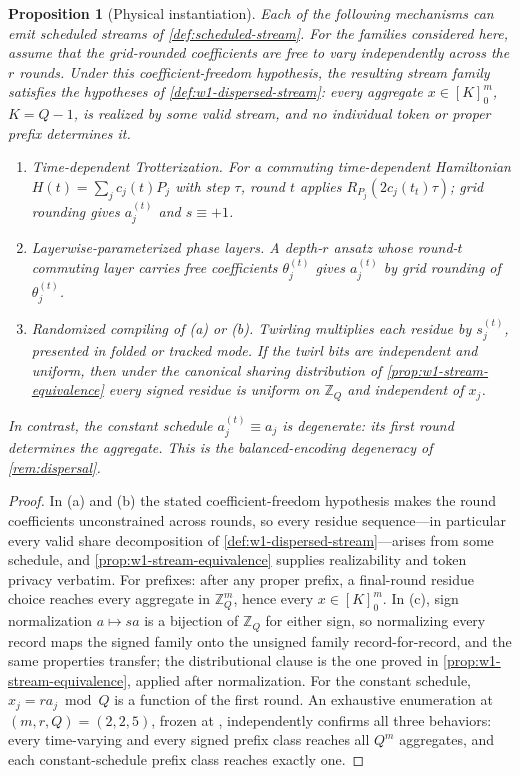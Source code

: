 \documentclass[a4paper,twocolumn,10pt,unpublished]{quantumarticle}
\newtheorem{proposition}{Proposition}
\begin{document}
\begin{proposition}[Physical instantiation]
\label{prop:physical-instantiation}
Each of the following mechanisms can emit scheduled streams of
\cref{def:scheduled-stream}.  For the families considered here, assume
that the grid-rounded coefficients are free to vary independently across
the $r$ rounds.  Under this coefficient-freedom hypothesis, the resulting
stream family satisfies the hypotheses of
\cref{def:w1-dispersed-stream}: every aggregate
$x\in[K]_0^m$, $K=Q-1$, is realized by some valid stream, and no individual token
or proper prefix determines it.
\begin{enumerate}[leftmargin=1.7em,label=(\alph*)]
\item \emph{Time-dependent Trotterization.}  For a commuting
time-dependent Hamiltonian $H(t)=\sum_jc_j(t)P_j$ with step $\tau$,
round $t$ applies $R_{P_j}(2c_j(t_t)\tau)$; grid rounding gives
$a_j^{(t)}$ and $s\equiv+1$.
\item \emph{Layerwise-parameterized phase layers.}  A depth-$r$ ansatz
whose round-$t$ commuting layer carries free coefficients
$\theta_j^{(t)}$ gives $a_j^{(t)}$ by grid rounding of $\theta_j^{(t)}$.
\item \emph{Randomized compiling of (a) or (b).}  Twirling multiplies
each residue by $s_j^{(t)}$, presented in folded or tracked mode.  If
the twirl bits are independent and uniform, then under the canonical
sharing distribution of \cref{prop:w1-stream-equivalence} every signed
residue is uniform on $\mathbb Z_Q$ and independent of $x_j$.
\end{enumerate}
In contrast, the constant schedule $a_j^{(t)}\equiv a_j$ is degenerate:
its first round determines the aggregate.  This is the balanced-encoding
degeneracy of \cref{rem:dispersal}.
\end{proposition}

\begin{proof}
In (a) and (b) the stated coefficient-freedom hypothesis makes the round
coefficients unconstrained across rounds,
so every residue sequence---in particular every valid share
decomposition of \cref{def:w1-dispersed-stream}---arises from some
schedule, and \cref{prop:w1-stream-equivalence} supplies realizability
and token privacy verbatim.  For prefixes: after any proper prefix, a
final-round residue choice reaches every aggregate in $\mathbb Z_Q^m$,
hence every $x\in[K]_0^m$.  In (c), sign normalization $a\mapsto sa$ is
a bijection of $\mathbb Z_Q$ for either sign, so normalizing every
record maps the signed family onto the unsigned family
record-for-record, and the same properties transfer; the distributional
clause is the one proved in \cref{prop:w1-stream-equivalence}, applied
after normalization.  For the constant schedule, $x_j=ra_j\bmod Q$ is a
function of the first round.  An exhaustive enumeration at
$(m,r,Q)=(2,2,5)$, frozen at
, independently
confirms all three behaviors: every time-varying and every signed
prefix class reaches all $Q^m$ aggregates, and each constant-schedule
prefix class reaches exactly one.
\end{proof}
\end{document}
